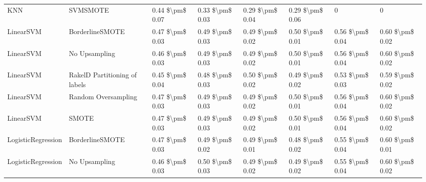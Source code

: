 \begin{tabular}{llllllll}
                            KNN &                      SVMSMOTE & 0.44 \$\textbackslash pm\$ 0.07 &           0.33 \$\textbackslash pm\$ 0.03 &       0.29 \$\textbackslash pm\$ 0.04 &        0.29 \$\textbackslash pm\$ 0.06 &                                       0 &                   0 \\
                      LinearSVM &               BorderlineSMOTE & 0.47 \$\textbackslash pm\$ 0.03 &           0.49 \$\textbackslash pm\$ 0.03 &       0.49 \$\textbackslash pm\$ 0.02 &        0.50 \$\textbackslash pm\$ 0.01 &                         0.56 \$\textbackslash pm\$ 0.04 &     0.60 \$\textbackslash pm\$ 0.02 \\
                      LinearSVM &                 No Upsampling & 0.46 \$\textbackslash pm\$ 0.03 &           0.49 \$\textbackslash pm\$ 0.03 &       0.49 \$\textbackslash pm\$ 0.02 &        0.50 \$\textbackslash pm\$ 0.01 &                         0.56 \$\textbackslash pm\$ 0.04 &     0.60 \$\textbackslash pm\$ 0.02 \\
                      LinearSVM & RakelD Partitioning of labels & 0.45 \$\textbackslash pm\$ 0.04 &           0.48 \$\textbackslash pm\$ 0.03 &       0.50 \$\textbackslash pm\$ 0.02 &        0.49 \$\textbackslash pm\$ 0.02 &                         0.53 \$\textbackslash pm\$ 0.03 &     0.59 \$\textbackslash pm\$ 0.02 \\
                      LinearSVM &           Random Oversampling & 0.47 \$\textbackslash pm\$ 0.03 &           0.49 \$\textbackslash pm\$ 0.03 &       0.49 \$\textbackslash pm\$ 0.02 &        0.50 \$\textbackslash pm\$ 0.01 &                         0.56 \$\textbackslash pm\$ 0.04 &     0.60 \$\textbackslash pm\$ 0.02 \\
                      LinearSVM &                         SMOTE & 0.47 \$\textbackslash pm\$ 0.03 &           0.49 \$\textbackslash pm\$ 0.03 &       0.49 \$\textbackslash pm\$ 0.02 &        0.50 \$\textbackslash pm\$ 0.01 &                         0.56 \$\textbackslash pm\$ 0.04 &     0.60 \$\textbackslash pm\$ 0.02 \\
             LogisticRegression &               BorderlineSMOTE & 0.47 \$\textbackslash pm\$ 0.03 &           0.49 \$\textbackslash pm\$ 0.02 &       0.49 \$\textbackslash pm\$ 0.01 &        0.48 \$\textbackslash pm\$ 0.02 &                         0.55 \$\textbackslash pm\$ 0.04 &     0.60 \$\textbackslash pm\$ 0.01 \\
             LogisticRegression &                 No Upsampling & 0.46 \$\textbackslash pm\$ 0.03 &           0.50 \$\textbackslash pm\$ 0.03 &       0.49 \$\textbackslash pm\$ 0.02 &        0.49 \$\textbackslash pm\$ 0.02 &                         0.55 \$\textbackslash pm\$ 0.04 &     0.60 \$\textbackslash pm\$ 0.02 \\

\end{tabular}
